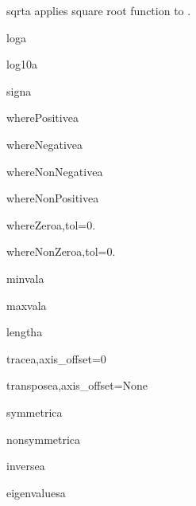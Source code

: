 \begin{funcdesc}{sqrt}{a}
applies square root function to .
\end{funcdesc}

\begin{funcdesc}{log}{a}
\end{funcdesc}

\begin{funcdesc}{log10}{a}
\end{funcdesc}

\begin{funcdesc}{sign}{a}
\end{funcdesc}

\begin{funcdesc}{wherePositive}{a}
\end{funcdesc}
\begin{funcdesc}{whereNegative}{a}
\end{funcdesc}
\begin{funcdesc}{whereNonNegative}{a}
\end{funcdesc}
\begin{funcdesc}{whereNonPositive}{a}
\end{funcdesc}
\begin{funcdesc}{whereZero}{a,tol=0.}
\end{funcdesc}
\begin{funcdesc}{whereNonZero}{a,tol=0.}
\end{funcdesc}
\begin{funcdesc}{minval}{a}
\end{funcdesc}
\begin{funcdesc}{maxval}{a}
\end{funcdesc}
\begin{funcdesc}{length}{a}
\end{funcdesc}
\begin{funcdesc}{trace}{a,axis_offset=0}
\end{funcdesc}
\begin{funcdesc}{transpose}{a,axis_offset=None}
\end{funcdesc}
\begin{funcdesc}{symmetric}{a}
\end{funcdesc}
\begin{funcdesc}{nonsymmetric}{a}
\end{funcdesc}
\begin{funcdesc}{inverse}{a}
\end{funcdesc}
\begin{funcdesc}{eigenvalues}{a}
\end{funcdesc}
